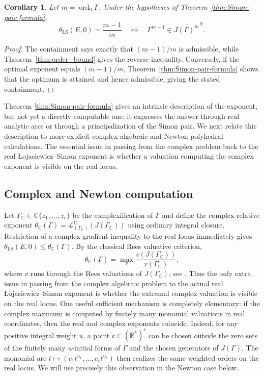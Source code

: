 \documentclass[11pt]{article}
\newtheorem{corollary}[theorem]{Corollary}
\theoremstyle{definition}
\theoremstyle{remark}
\begin{document}
\begin{corollary}\label{cor:order-sharpness}
Let $m=\operatorname{ord}_0\Gamma$. Under the hypotheses of Theorem~\ref{thm:Simon-pair-formula},
$$
\theta_{\mathrm{LS}}(E,0)=\frac{m-1}{m}
\quad\Longleftrightarrow\quad
\Gamma^{m-1}\in\overline{J(\Gamma)^m}^{\,\mathbb R}.
$$
\end{corollary}

\begin{proof}
The containment says exactly that $(m-1)/m$ is admissible, while Theorem~\ref{thm:order_bound} gives the reverse inequality. Conversely, if the optimal exponent equals $(m-1)/m$, Theorem~\ref{thm:Simon-pair-formula} shows that the optimum is attained and hence admissible, giving the stated containment.
\end{proof}

Theorem \ref{thm:Simon-pair-formula} gives an intrinsic description of the exponent, but not yet a directly computable one: it expresses the answer through real analytic arcs or through a principalization of the Simon pair. We next relate this description to more explicit complex-algebraic and Newton-polyhedral calculations. The essential issue in passing from the complex problem back to the real \L{}ojasiewicz--Simon exponent is whether a valuation computing the complex exponent is visible on the real locus.


\subsection{Complex and Newton computation}

Let $\Gamma_{\mathbb C}\in\mathbb C\{z_1,\ldots,z_r\}$ be the complexification of $\Gamma$ and define the complex relative exponent
$\theta_{\mathbb C}(\Gamma)=\mathcal L^{\mathbb C}_{(\Gamma_{\mathbb C})}(J(\Gamma_{\mathbb C}))$ using ordinary integral closure. Restriction of a complex gradient inequality to the real locus immediately gives
$\theta_{\mathrm{LS}}(E,0)\le\theta_{\mathbb C}(\Gamma)$. By the classical Rees valuative criterion,
$$
\theta_{\mathbb C}(\Gamma)
=\max_v\frac{v(J(\Gamma_{\mathbb C}))}{v(\Gamma_{\mathbb C})},
$$
where $v$ runs through the Rees valuations of $J(\Gamma_{\mathbb C})$; see \cite{HunekeSwanson2006,Ha2026}. Thus the only extra issue in passing from the complex algebraic problem to the actual real \L{}ojasiewicz--Simon exponent is whether the extremal complex valuation is visible on the real locus. One useful sufficient mechanism is completely elementary: if the complex maximum is computed by finitely many monomial valuations in real coordinates, then the real and complex exponents coincide. Indeed, for any positive integral weight $u$, a point $c\in(\mathbb R^*)^r$ can be chosen outside the zero sets of the finitely many $u$-initial forms of $\Gamma$ and the chosen generators of $J(\Gamma)$. The monomial arc $t\mapsto(c_1t^{u_1},\ldots,c_rt^{u_r})$ then realizes the same weighted orders on the real locus. We will use precisely this observation in the Newton case below.
\end{document}
